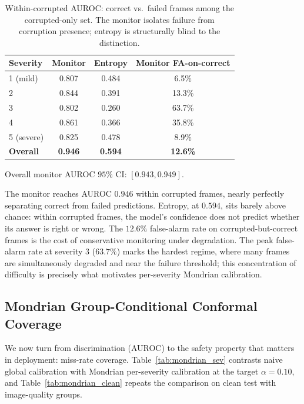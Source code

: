 \documentclass[letterpaper, 10 pt, conference]{ieeeconf}  %
\begin{document}
\begin{table}[t]
\caption{Within-corrupted AUROC: correct vs.\ failed frames among the corrupted-only set. The monitor isolates failure from corruption presence; entropy is structurally blind to the distinction.}
\label{tab:circularity}
\centering
\small
\begin{tabular}{lccc}
\toprule
Severity & Monitor & Entropy & Monitor FA-on-correct \\
\midrule
1 (mild)   & 0.807 & 0.484 & 6.5\% \\
2          & 0.844 & 0.391 & 13.3\% \\
3          & 0.802 & 0.260 & 63.7\% \\
4          & 0.861 & 0.366 & 35.8\% \\
5 (severe) & 0.825 & 0.478 & 8.9\% \\
\midrule
\textbf{Overall} & \textbf{0.946} & \textbf{0.594} & \textbf{12.6\%} \\
\bottomrule
\end{tabular}
\par\vspace{2pt}
{\footnotesize Overall monitor AUROC $95\%$ CI: $[0.943, 0.949]$.}
\end{table}

The monitor reaches AUROC $0.946$ within corrupted frames, nearly perfectly
separating correct from failed predictions. Entropy, at $0.594$, sits barely
above chance: within corrupted frames, the model's confidence does not
predict whether its answer is right or wrong. The $12.6\%$ false-alarm rate
on corrupted-but-correct frames is the cost of conservative monitoring under
degradation. The peak false-alarm rate at severity $3$ ($63.7\%$) marks the
hardest regime, where many frames are simultaneously degraded and near the
failure threshold; this concentration of difficulty is precisely what
motivates per-severity Mondrian calibration.

\subsection{Mondrian Group-Conditional Conformal Coverage}

We now turn from discrimination (AUROC) to the safety property that matters
in deployment: miss-rate coverage. Table~\ref{tab:mondrian_sev} contrasts
naive global calibration with Mondrian per-severity calibration at the target
$\alpha = 0.10$, and Table~\ref{tab:mondrian_clean} repeats the comparison on
clean test with image-quality groups.
\end{document}
